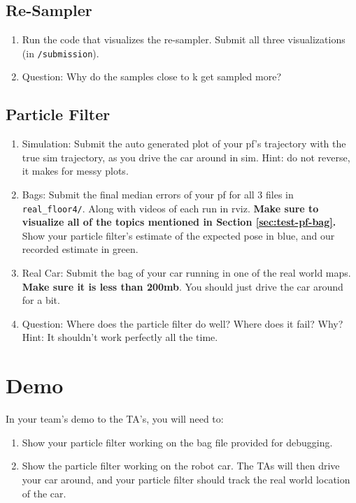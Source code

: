 \documentclass[final]{article}
\begin{document}
\subsection{Re-Sampler}
\begin{enumerate}
\item Run the code that visualizes the re-sampler. Submit all three visualizations (in \texttt{/submission}).
\item Question: Why do the samples close to k get sampled more?
\end{enumerate}

\subsection{Particle Filter}
\begin{enumerate}
\item Simulation: Submit the auto generated plot of your pf's trajectory with the true sim trajectory, as you drive the car around in sim. Hint: do not reverse, it makes for messy plots.
\item Bags: Submit the final median errors of your pf for all 3 files in \texttt{real\_floor4/}. Along with videos of each run in rviz. \textbf{Make sure to visualize all of the topics mentioned in Section \ref{sec:test-pf-bag}.} Show your particle filter's estimate of the expected pose in blue, and our recorded estimate in green.
\item Real Car: Submit the bag of your car running in one of the real world maps. \textbf{Make sure it is less than 200mb}. You should just drive the car around for a bit.
\item Question: Where does the particle filter do well? Where does it fail? Why? Hint: It shouldn’t work perfectly all the time.
\end{enumerate}

\section{Demo}

In your team’s demo to the TA’s, you will need to:
\begin{enumerate}
	\item Show your particle filter working on the bag file provided for debugging.
	\item Show the particle filter working on the robot car. The TAs will then drive your car around, and your particle filter should track the real world location
of the car.
\end{enumerate}
\end{document}
